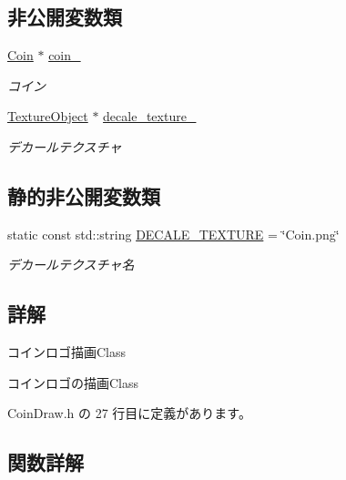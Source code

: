 \subsection*{非公開変数類}
\begin{DoxyCompactItemize}
\item 
\mbox{\hyperlink{class_coin}{Coin}} $\ast$ \mbox{\hyperlink{class_coin_draw_a62baab6b1a22df45ce4c81970f4a38f4}{coin\+\_\+}}
\begin{DoxyCompactList}\small\item\em コイン \end{DoxyCompactList}\item 
\mbox{\hyperlink{class_texture_object}{Texture\+Object}} $\ast$ \mbox{\hyperlink{class_coin_draw_ab694450b118b4a251bcff5816df85168}{decale\+\_\+texture\+\_\+}}
\begin{DoxyCompactList}\small\item\em デカールテクスチャ \end{DoxyCompactList}\end{DoxyCompactItemize}
\subsection*{静的非公開変数類}
\begin{DoxyCompactItemize}
\item 
static const std\+::string \mbox{\hyperlink{class_coin_draw_a3c6a7373d27976867c12bbbd543e1567}{D\+E\+C\+A\+L\+E\+\_\+\+T\+E\+X\+T\+U\+RE}} = \char`\"{}Coin.\+png\char`\"{}
\begin{DoxyCompactList}\small\item\em デカールテクスチャ名 \end{DoxyCompactList}\end{DoxyCompactItemize}


\subsection{詳解}
コインロゴ描画\+Class 

コインロゴの描画\+Class 

 Coin\+Draw.\+h の 27 行目に定義があります。



\subsection{関数詳解}
\mbox{\label{class_coin_draw_ac7d91fecb6845cebe276eb81a4953563}} 
